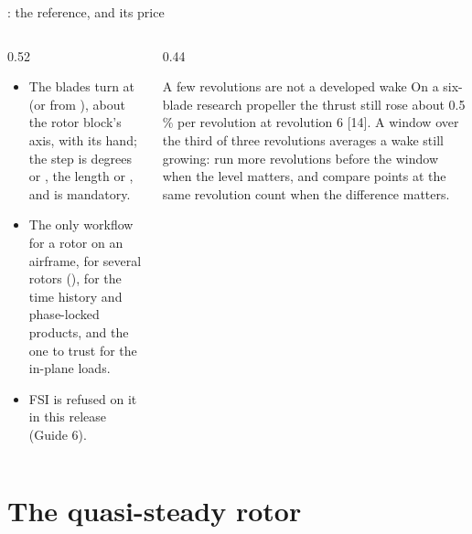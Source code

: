 \begin{frame}{: the reference, and its price}
\begin{columns}[T]
\begin{column}{0.52\textwidth}
\begin{itemize}\small
  \item The blades turn at  (or from ), about
        the rotor block's axis, with its hand; the step is 
        degrees or , the length  or
        , and  is mandatory.
  \item The only workflow for a rotor on an airframe, for several rotors
        (), for the time history and phase-locked products, and
        the one to trust for the in-plane loads.
  \item FSI is refused on it in this release (Guide 6).
\end{itemize}
\end{column}
\begin{column}{0.44\textwidth}
\begin{alertblock}{A few revolutions are not a developed wake}
\small On a six-blade research propeller the thrust still rose about
0.5\,\% per revolution at revolution 6 [14]. A window over the third of three
revolutions averages a wake still growing: run more revolutions before the
window when the level matters, and compare points at the same revolution
count when the difference matters.
\end{alertblock}
\end{column}
\end{columns}
\end{frame}

\section{The quasi-steady rotor}

